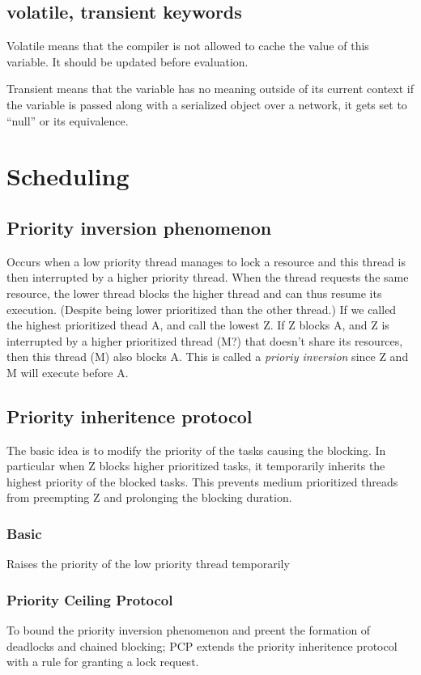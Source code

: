 \documentclass[a4paper]{article}
\begin{document}
\subsection{volatile, transient keywords}
Volatile means that the compiler is not allowed to cache the value of this
variable. It should be updated before evaluation.

Transient means that the variable has no meaning outside of its current context
if the variable is passed along with a serialized object over a network, it
gets set to ``null'' or its equivalence.

\section{Scheduling}
\subsection{Priority inversion phenomenon}
Occurs when a low priority thread manages to lock a resource and this thread
is then interrupted by a higher priority thread. When the thread requests the
same resource, the lower thread blocks the higher thread and can thus resume
its execution. (Despite being lower prioritized than the other thread.)
If we called the highest prioritized thead A, and call the lowest Z. If Z
blocks A, and Z is interrupted by a higher prioritized thread (M?) that doesn't
share its resources, then this thread (M) also blocks A. This is called a 
\emph{prioriy inversion} since Z and M will execute before A.

\subsection{Priority inheritence protocol}
The basic idea is to modify the priority of the tasks causing the blocking. In
particular when Z blocks higher prioritized tasks, it temporarily inherits the
highest priority of the blocked tasks. This prevents medium prioritized threads
from preempting Z and prolonging the blocking duration.
\subsubsection{Basic}
Raises the priority of the low priority thread temporarily
\subsubsection{Priority Ceiling Protocol}
To bound the priority inversion phenomenon and preent the formation of deadlocks
and chained blocking; PCP extends the priority inheritence protocol with a
rule for granting a lock request.
\end{document}
